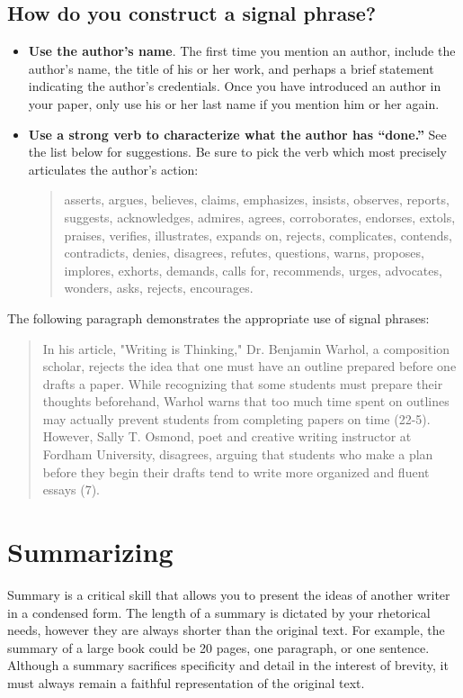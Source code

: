 \subsection{How do you construct a signal phrase?}
 
\begin{itemize}
\item \textbf{Use the author's name}. The first time you mention an author, include the 
author's name, the title of his or her work, and perhaps a brief statement indicating the 
author's credentials. Once you have introduced an author in your paper, only use his or 
her last name if you mention him or her again.

\item \textbf{Use a strong verb to characterize what the author has “done.”} See the list 
below for suggestions. Be sure to pick the verb which most precisely articulates the 
author's action:

\begin{quote}
asserts, argues, believes, claims, emphasizes, insists, observes, reports, 
suggests, acknowledges, admires, agrees, corroborates, endorses, extols, praises, 
verifies, illustrates, expands on, rejects, complicates, contends, contradicts, denies, 
disagrees, refutes, questions, warns, proposes, implores, exhorts, demands, calls for, 
recommends, urges, advocates, wonders, asks, rejects, encourages.
\end{quote}

\end{itemize}
 
The following paragraph demonstrates the appropriate use of signal phrases:
 
 \begin{quote}
In his article, "Writing is Thinking," Dr. Benjamin Warhol, a composition scholar, rejects 
the idea that one must have an outline prepared before one drafts a paper. While 
recognizing that some students must prepare their thoughts beforehand, Warhol warns 
that too much time spent on outlines may actually prevent students from completing 
papers on time (22-5). However, Sally T. Osmond, poet and  creative writing instructor at 
Fordham University, disagrees, arguing that students who make a plan before they 
begin their drafts tend to write more organized and fluent essays (7). \end{quote}

\section{Summarizing}
Summary is a critical skill that allows you to present the ideas of another writer in a condensed form. The length of a summary is dictated by your rhetorical needs, however they are always shorter
than the original text. For example, the summary of a large book could be 20 pages, one paragraph, or one sentence. Although a summary sacrifices specificity and detail in the interest of brevity, it must always remain a faithful representation of the original text.


